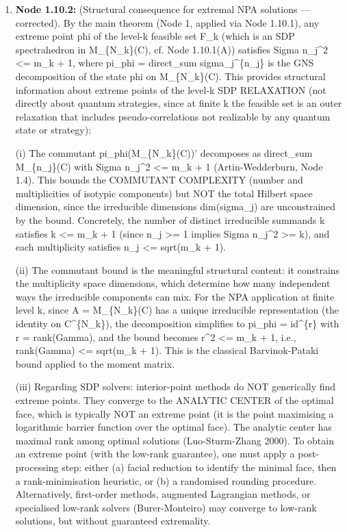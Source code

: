 \documentclass{article}
\begin{document}
\begin{enumerate}
\begin{enumerate}
This node is a corollary/application depending on Nodes 1 (main theorem), 1.3-1.4 (dimension bound and commutant decomposition), and 1.6 (matrix algebra recovery for SDP spectrahedra). It also depends on the definitions of NPA\_hierarchy and affinely\_constrained\_state\_space.

  Type: claim, Inference: assumption, Status: pending, Taint: unresolved

\item \textbf{Node 1.10.2:} (Structural consequence for extremal NPA solutions — corrected). By the main theorem (Node 1, applied via Node 1.10.1), any extreme point phi of the level-k feasible set F\_k (which is an SDP spectrahedron in M\_\{N\_k\}(C), cf. Node 1.10.1(A)) satisfies Sigma n\_j\textasciicircum{}2 <= m\_k + 1, where pi\_phi = direct\_sum sigma\_j\textasciicircum{}\{n\_j\} is the GNS decomposition of the state phi on M\_\{N\_k\}(C). This provides structural information about extreme points of the level-k SDP RELAXATION (not directly about quantum strategies, since at finite k the feasible set is an outer relaxation that includes pseudo-correlations not realizable by any quantum state or strategy):

(i) The commutant pi\_phi(M\_\{N\_k\}(C))' decomposes as direct\_sum M\_\{n\_j\}(C) with Sigma n\_j\textasciicircum{}2 <= m\_k + 1 (Artin-Wedderburn, Node 1.4). This bounds the COMMUTANT COMPLEXITY (number and multiplicities of isotypic components) but NOT the total Hilbert space dimension, since the irreducible dimensions dim(sigma\_j) are unconstrained by the bound. Concretely, the number of distinct irreducible summands k satisfies k <= m\_k + 1 (since n\_j >= 1 implies Sigma n\_j\textasciicircum{}2 >= k), and each multiplicity satisfies n\_j <= sqrt(m\_k + 1).

(ii) The commutant bound is the meaningful structural content: it constrains the multiplicity space dimensions, which determine how many independent ways the irreducible components can mix. For the NPA application at finite level k, since A = M\_\{N\_k\}(C) has a unique irreducible representation (the identity on C\textasciicircum{}\{N\_k\}), the decomposition simplifies to pi\_phi = id\textasciicircum{}\{r\} with r = rank(Gamma), and the bound becomes r\textasciicircum{}2 <= m\_k + 1, i.e., rank(Gamma) <= sqrt(m\_k + 1). This is the classical Barvinok-Pataki bound applied to the moment matrix.

(iii) Regarding SDP solvers: interior-point methods do NOT generically find extreme points. They converge to the ANALYTIC CENTER of the optimal face, which is typically NOT an extreme point (it is the point maximising a logarithmic barrier function over the optimal face). The analytic center has maximal rank among optimal solutions (Luo-Sturm-Zhang 2000). To obtain an extreme point (with the low-rank guarantee), one must apply a post-processing step: either (a) facial reduction to identify the minimal face, then a rank-minimisation heuristic, or (b) a randomised rounding procedure. Alternatively, first-order methods, augmented Lagrangian methods, or specialised low-rank solvers (Burer-Monteiro) may converge to low-rank solutions, but without guaranteed extremality.


\end{enumerate}
\end{enumerate}
\end{document}
